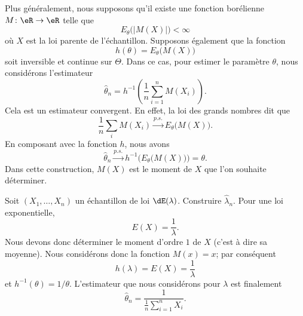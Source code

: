 Plus généralement, nous supposons qu'il existe une fonction borélienne \( M\colon \eR\to \eR\) telle que
\begin{equation}
    E_{\theta}\big( | M(X) | \big)<\infty
\end{equation}
où \( X\) est la loi parente de l'échantillon. Supposons également que la fonction 
\begin{equation}
    h(\theta)=E_{\theta}\big( M(X) \big)
\end{equation}
soit inversible et continue sur \( \Theta\). Dans ce cas, pour estimer le paramètre \( \theta\), nous considérons l'estimateur
\begin{equation}
    \hat\theta_n=h^{-1}\left( \frac{1}{ n }\sum_{i=1}^nM(X_i) \right).
\end{equation}
Cela est un estimateur convergent. En effet, la loi des grands nombres dit que
\begin{equation}
    \frac{1}{ n }\sum_iM(X_i)\stackrel{p.s.}{\longrightarrow}E_{\theta}\big( M(X) \big).
\end{equation}
En composant avec la fonction \( h\), nous avons
\begin{equation}
    \hat\theta_n\stackrel{p.s.}{\longrightarrow}h^{-1}\Big( E_{\theta}\big( M(X) \big) \Big)=\theta.
\end{equation}
Dans cette construction, \( M(X)\) est le moment de \( X\) que l'on souhaite déterminer.

\begin{example}
    Soit \( (X_1,\ldots,X_n)\) un échantillon de loi \( \dE(\lambda)\). Construire \( \hat\lambda_n\). Pour une loi exponentielle,
    \begin{equation}
        E(X)=\frac{1}{ \lambda }.
    \end{equation}
    Nous devons donc déterminer le moment d'ordre \( 1\) de \( X\) (c'est à dire sa moyenne). Nous considérons donc la fonction \( M(x)=x\); par conséquent
    \begin{equation}
        h(\lambda)=E(X)=\frac{1}{ \lambda }
    \end{equation}
    et \( h^{-1}(\theta)=1/\theta\). L'estimateur que nous considérons pour \( \lambda\) est finalement
    \begin{equation}
        \hat\theta_n=\frac{1}{ \frac{1}{ n }\sum_{i=1}^nX_i }.
    \end{equation}
\end{example}

